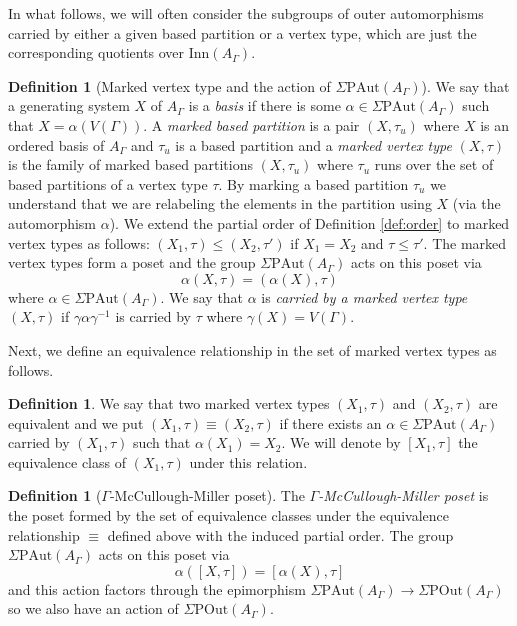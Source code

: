 \documentclass[a4paper]{amsart}
\newcommand{\G}{\Gamma}
\newcommand{\PAut}{\Sigma\mathrm{PAut}}
\newcommand{\POut}{\Sigma\mathrm{POut}}
\newcommand{\Inn}{\mathrm{Inn}}
\theoremstyle{definition}
\newtheorem{defi}[teo]{Definition}
\theoremstyle{remark}
\begin{document}
In what follows, we will often consider the subgroups of outer automorphisms carried by either a given based partition or a vertex type, which are just the corresponding quotients over $\Inn(A_\G)$.




\begin{defi}[Marked vertex type and the action of $\PAut(A_\G)$] We say that a generating system $X$ of $A_\G$ is a {\sl basis} if there is some $\alpha\in\PAut(A_\G)$ such that $X=\alpha(V(\G))$.
A {\sl marked based partition} is a pair $(X,\tau_u)$ where $X$ is an ordered basis of $A_\G$ and $\tau_u$ is a based partition and a {\sl marked vertex type} $(X,\tau)$ is the family of marked based partitions $(X,\tau_u)$ where $\tau_u$ runs over the set of based partitions of a vertex type $\tau$. By marking a based partition $\tau_u$ we understand that we are relabeling the elements in the partition using $X$ (via the automorphism $\alpha$). We extend the partial order of Definition \ref{def:order} to marked vertex types as follows: $(X_1,\tau)\leq(X_2,\tau')$ if $X_1=X_2$ and $\tau\leq\tau'$. The marked vertex types form a poset and the group $\PAut(A_\G)$ acts on this poset via $$\alpha(X,\tau)=(\alpha(X),\tau)$$
where $\alpha\in\PAut(A_\G)$.
We say that $\alpha$ is {\sl carried by a marked vertex type} $(X,\tau)$ if $\gamma\alpha\gamma^{-1}$ is carried by $\tau$ where $\gamma(X)=V(\G)$.
\end{defi}

Next, we define an equivalence relationship in the set of marked vertex types as follows.

\begin{defi}
     We say that two marked vertex types $(X_1,\tau)$ and $(X_2,\tau)$ are equivalent and we put  $(X_1,\tau)\equiv (X_2,\tau)$ if
there exists an $\alpha\in\PAut(A_\G)$ carried by $(X_1,\tau)$ such that $\alpha(X_1)=X_2$. We will denote by $[X_1,\tau]$ the equivalence class of $(X_1,\tau)$ under this relation. 
\end{defi}



\begin{defi}[$\G$-McCullough-Miller poset]
    The {\sl $\G$-McCullough-Miller poset} is the poset formed by the set of equivalence classes under the equivalence relationship $\equiv$ defined above with the induced partial order.
    The group $\PAut(A_\G)$ acts on this poset via $$\alpha([X,\tau])=[\alpha(X),\tau]$$
    and this action factors through the epimorphism $\PAut(A_\G)\to\POut(A_\G)$ so we also have an action of $\POut(A_\G)$.
\end{defi}
\end{document}
